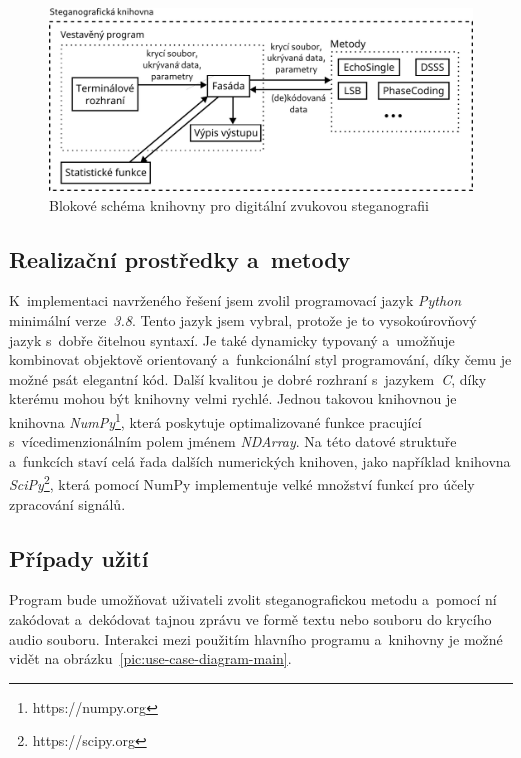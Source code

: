 \begin{figure}[hbt]
    \centering
    \includegraphics[width=\textwidth]{obrazky/block-diagram.pdf}
    \caption{Blokové schéma knihovny pro digitální zvukovou steganografii}
    \label{pic:library-block-diagram}
\end{figure}

\subsection*{Realizační prostředky a~metody}
\label{sub:solution-tool-choices}

K~implementaci navrženého řešení jsem zvolil programovací jazyk \textit{Python}
minimální verze~\textit{3.8}. Tento jazyk jsem vybral, protože je to
vysokoúrovňový jazyk s~dobře čitelnou syntaxí. Je také dynamicky typovaný
a~umožňuje kombinovat objektově orientovaný a~funkcionální styl programování,
díky čemu je možné psát elegantní kód. Další kvalitou je dobré rozhraní
s~jazykem~\textit{C}, díky kterému mohou být knihovny velmi rychlé. Jednou
takovou knihovnou je knihovna \textit{NumPy}\footnote{https://numpy.org}, která
poskytuje optimalizované funkce pracující s~vícedimenzionálním polem jménem
\textit{NDArray}. Na této datové struktuře a~funkcích staví celá řada dalších
numerických knihoven, jako například knihovna
\textit{SciPy}\footnote{https://scipy.org}, která pomocí NumPy implementuje
velké množství funkcí pro účely zpracování signálů.

\blindtext

\subsection*{Případy užití}
\label{sub:use-cases}

Program bude umožňovat uživateli zvolit steganografickou metodu a~pomocí ní
zakódovat a~dekódovat tajnou zprávu ve formě textu nebo souboru do krycího
audio souboru. Interakci mezi použitím hlavního programu a~knihovny je možné
vidět na obrázku~\ref{pic:use-case-diagram-main}.

